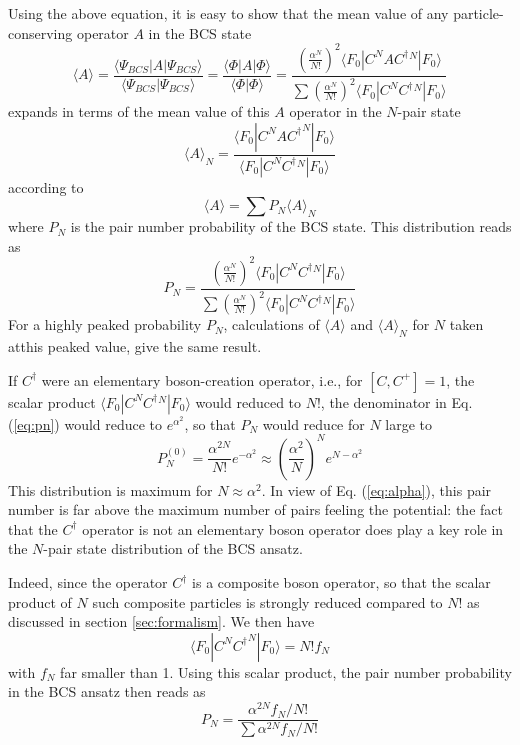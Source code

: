 \documentclass[aps,prb,preprint,groupedaddress,amsmath]{revtex4-1}
\newcommand{\dg}{\ensuremath{\dagger}}
\begin{document}
Using the above equation, it is easy to show that the mean value of any particle-conserving operator $A$ in the BCS state
\begin{equation}
\langle{A}\rangle=\frac{\langle\Psi_{BCS}|A|\Psi_{BCS}{\rangle}}
{\langle\Psi_{BCS}|\Psi_{BCS}{\rangle}}=\frac{\langle\Phi|A|\Phi{\rangle}}
{\langle\Phi|\Phi{\rangle}}=\frac{\left(\frac{\alpha^N}{N!}\right)^2\langle{}F_0|{C}^NA{C^\dg}{}^N|F_0{\rangle}}
{\sum{\left(\frac{\alpha^{N}}{N!}\right)^2\langle{}F_0|{C}^N{C^\dg}{}^N|F_0\rangle}}
\end{equation}
 expands in terms of the mean value of this $A$ operator in the $N$-pair state
\begin{equation}
\langle{A}\rangle_N=\frac{\langle{}F_0|C^NA{C^\dg}^N|F_0{\rangle}}
{\langle{}F_0|{C}^N{{C}^\dg}{} ^N|F_0{\rangle}}\end{equation}
according to 
\begin{equation}
\langle{A}\rangle=\sum{P_N}\langle{A}\rangle_N
\end{equation}
where $P_N$ is the pair number probability of the BCS state. This distribution reads as 
\begin{equation}\label{eq:pn}
P_N=\frac{\left(\frac{\alpha^{N}}{N!}\right)^2\langle{}F_0|{C}^N{C^\dg}{}^N|F_0{\rangle}}
{\sum{\left(\frac{\alpha^{N}}{N!}\right)^2\langle{}F_0|{C}^N{C^\dg}{}^N|F_0\rangle}}
\end{equation} 
For a highly peaked probability $P_N$, calculations of $\langle{A}\rangle$ and $\langle{A}\rangle_N$ for $N$ taken atthis peaked value, give the same result. 

If $C^\dg$ were an elementary boson-creation operator, i.e., for $[{C},{C}^+]=1$, the scalar product $\langle{}F_0|{C}^N{C^\dg}{}^N|F_0{\rangle}$ would reduced to $N!$, the denominator in Eq.(\ref{eq:pn}) would reduce to $e^{\alpha^2}$, so that $P_N$ would reduce for $N$ large to 
\begin{equation}
 P_N^{(0)}=\frac{\alpha^{2N}}{N!}e^{-\alpha^2}\approx\left(\frac{\alpha^2}{N}\right)^Ne^{N-\alpha^2}
\end{equation}
This distribution is maximum for $N\approx\alpha^2$. In view of  Eq. (\ref{eq:alpha}), this pair number is far above the maximum number of pairs feeling the potential: the fact that the $C^\dg$ operator is not an elementary boson operator does play a key role in the $N$-pair state distribution of the BCS ansatz. 

Indeed,  since the operator $C^\dg$ is a composite boson operator, so that the scalar product of $N$ such composite particles is strongly reduced compared to $N!$ as discussed in section \ref{sec:formalism}.  We then have 
\begin{equation}
\langle{}F_0|{C}^N{C^\dg}^N|F_0{\rangle}=N!f_N
\end{equation}
with $f_N$ far smaller than 1.  Using this scalar product, the pair number probability in the BCS ansatz then reads as
\begin{equation}
P_N=\frac{\alpha^{2N}f_N/N!}{\sum\alpha^{2N}f_N/N!}
\end{equation}
\end{document}
